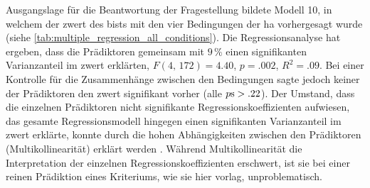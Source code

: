 \documentclass[11pt, twoside, a4paper]{book}		%
\begin{document}
Ausgangslage für die Beantwortung der Fragestellung bildete Modell 10, in welchem der \gls{zwert} des \gls{bist}s mit den vier Bedingungen der \gls{ha} vorhergesagt wurde (siehe \autoref{tab:multiple_regression_all_conditions}). Die Regressionsanalyse hat ergeben, dass die Prädiktoren gemeinsam mit $9\,\%$ einen signifikanten Varianzanteil im \gls{zwert} erklärten, $F(4,\,172)=4.40$, $p=.002$, $R^2=.09$. Bei einer Kontrolle für die Zusammenhänge zwischen den Bedingungen sagte jedoch keiner der Prädiktoren den \gls{zwert} signifikant vorher (alle $p\textnormal{s}>.22$). Der Umstand, dass die einzelnen Prädiktoren nicht signifikante Regressionskoeffizienten aufwiesen, das gesamte Regressionsmodell hingegen einen signifikanten Varianzanteil im \gls{zwert} erklärte, konnte durch die hohen Abhängigkeiten zwischen den Prädiktoren (Multikollinearität) erklärt werden \citep[S. 686]{Eid2013}. Während Multikollinearität die Interpretation der einzelnen Regressionskoeffizienten erschwert, ist sie bei einer reinen Prädiktion eines Kriteriums, wie sie hier vorlag, unproblematisch.
\end{document}
